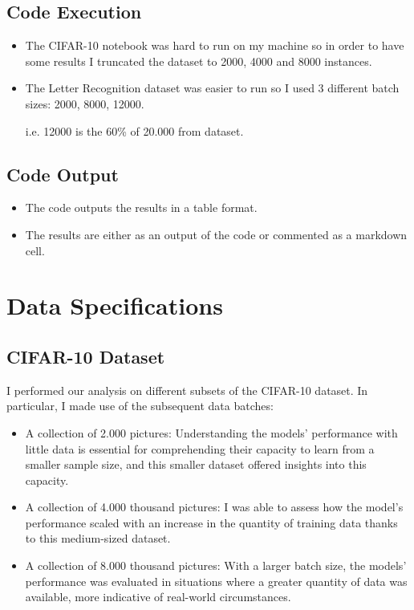 \documentclass[conference]{IEEEtran}
\begin{document}
\subsection{Code Execution}

\begin{itemize}
\item The CIFAR-10 notebook was hard to run on my machine so in order to have some results I truncated the dataset to 2000, 4000 and 8000 instances.
\item The Letter Recognition dataset was easier to run so I used 3 different batch sizes: 2000, 8000, 12000.

i.e. 12000 is the 60\% of 20.000 from dataset.
\end{itemize}

\subsection{Code Output}

\begin{itemize}
\item The code outputs the results in a table format.
\item The results are either as an output of the code or commented as a markdown cell. 
\end{itemize}

\section{Data Specifications}

\subsection{CIFAR-10 Dataset}

I performed our analysis on different subsets of the CIFAR-10 dataset. In particular, I made use of the subsequent data batches:

\begin{itemize}
\item A collection of 2.000 pictures: Understanding the models' performance with little data is essential for comprehending their capacity to learn from a smaller sample size, and this smaller dataset offered insights into this capacity.
\item A collection of 4.000 thousand pictures: I was able to assess how the model's performance scaled with an increase in the quantity of training data thanks to this medium-sized dataset.
\item A collection of 8.000 thousand pictures: With a larger batch size, the models' performance was evaluated in situations where a greater quantity of data was available, more indicative of real-world circumstances.
\end{itemize}
\end{document}
